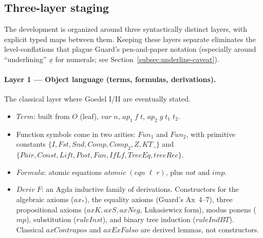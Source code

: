 \documentclass[11pt]{article}
\begin{document}
\subsection{Three-layer staging}
\label{subsec:layers}

The development is organized around three syntactically distinct
layers, with explicit typed maps between them.  Keeping these layers
separate eliminates the level-conflations that plague Guard's
pen-and-paper notation (especially around ``underlining''
$\underline{x}$ for numerals; see Section~\ref{subsec:underline-caveat}).

\paragraph{Layer 1 --- Object language (terms, formulas, derivations).}
The classical layer where Goedel I/II are eventually stated.
\begin{itemize}
  \item $\mathit{Term}$: built from $O$ (leaf), $\mathit{var}\;n$,
        $\mathit{ap}_1\;f\;t$, $\mathit{ap}_2\;g\;t_1\;t_2$.
  \item Function symbols come in two arities: $\mathit{Fun}_1$ and $\mathit{Fun}_2$, with primitive constants
        $\{I, \mathit{Fst}, \mathit{Snd}, \mathit{Comp}, \mathit{Comp}_2, \mathit{Z}, \mathit{KT}\,\_\}$ and
        $\{\mathit{Pair}, \mathit{Const}, \mathit{Lift}, \mathit{Post}, \mathit{Fan}, \mathit{IfLf}, \mathit{TreeEq}, \mathit{treeRec}\}$.
  \item $\mathit{Formula}$: atomic equations $\mathit{atomic}\;(\mathit{eqn}\;\ell\;r)$, plus $\mathit{not}$ and $\mathit{imp}$.
  \item $\mathit{Deriv}\;F$: an Agda inductive family of derivations.
        Constructors for the algebraic axioms ($\mathit{ax}_*$), the
        equality axioms (Guard's Ax~4--7), three propositional
        axioms ($\mathit{axK}, \mathit{axS}, \mathit{axNeg}$, Lukasiewicz form), modus ponens ($\mathit{mp}$),
        substitution ($\mathit{ruleInst}$), and binary tree induction ($\mathit{ruleIndBT}$).
        Classical $\mathit{axContrapos}$ and $\mathit{axExFalso}$ are derived
        lemmas, not constructors.
\end{itemize}
\end{document}
